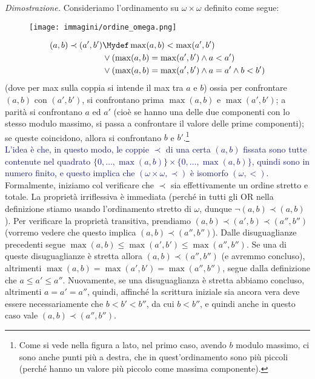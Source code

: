 \documentclass[11pt]{scrartcl}
\begin{document}
\newpage
\pagebreak
\hspace{-0.43cm}\emph{Dimostrazione.}\hspace{-0.70cm} Consideriamo l'ordinamento su $\omega \times \omega$ definito come segue:
	\begin{wrapfigure}[9]{l}{2.5cm}
		\texttt{[image: immagini/ordine\_omega.png]}
	\end{wrapfigure}
	\[ \begin{split}
		(a,b) \prec (a',b') &\Mydef \max(a,b) < \max(a',b') \\
							&\lor (\max(a,b) = \max(a',b') \land a < a') \\
							&\lor (\max(a,b) = \max(a',b') \land a = a' \land b < b')
	\end{split}
		\]
	(dove per max sulla coppia si intende il max tra $a$ e $b$) ossia per confrontare $(a,b)$ con $(a',b')$, si confrontano prima $\max(a,b)$ e $\max(a',b')$; a parità si confrontano $a$ ed $a'$ (cioè se hanno una delle due componenti con lo stesso modulo massimo, si passa a confrontare il valore delle prime componenti);
	se queste coincidono, allora si confrontano $b$ e $b'$.\footnote{Come si vede nella figura a lato, nel primo caso, avendo $b$ modulo massimo, ci sono anche punti più a destra, che in quest'ordinamento sono più piccoli (perché hanno un valore più piccolo come massima componente).}\\
	\textcolor{MidnightBlue}{L'idea è che, in questo modo, le coppie $\prec$ di una certa $(a,b)$ fissata sono tutte contenute nel quadrato $\{0,\ldots,\max(a,b)\} \times \{0,\ldots,\max(a,b)\}$, quindi sono in numero finito, e questo 
	implica che $(\omega \times \omega, \prec)$ è isomorfo $(\omega,<)$.}\\
	Formalmente, iniziamo col verificare che $\prec$ sia effettivamente un ordine stretto e totale. La proprietà irriflessiva è immediata (perché in tutti gli OR nella definizione stiamo usando l'ordinamento stretto di $\omega$, dunque
	$\neg (a,b) \prec (a,b)$). Per verificare la proprietà transitiva, prendiamo $(a,b) \prec (a',b) \prec (a'',b'')$ (vorremo vedere che questo implica $(a,b) \prec (a'',b'')$). Dalle disuguaglianze precedenti segue $\max(a,b) \leq \max(a',b') \leq \max(a'',b'')$. Se una di queste disuguaglianze è stretta allora $(a,b) \prec (a'',b'')$ (e avremmo concluso),
	altrimenti $\max(a,b) = \max(a',b') = \max(a'',b'')$, segue dalla definizione che $a \leq a' \leq a''$.
	Nuovamente, se una disuguaglianza è stretta abbiamo concluso, altrimenti $a = a' = a''$, quindi, affinché la scrittura iniziale sia ancora vera deve essere necessariamente che $b < b' < b''$, da cui $b < b''$, e quindi anche in questo caso vale $(a,b) \prec (a'',b'')$.
\end{document}

